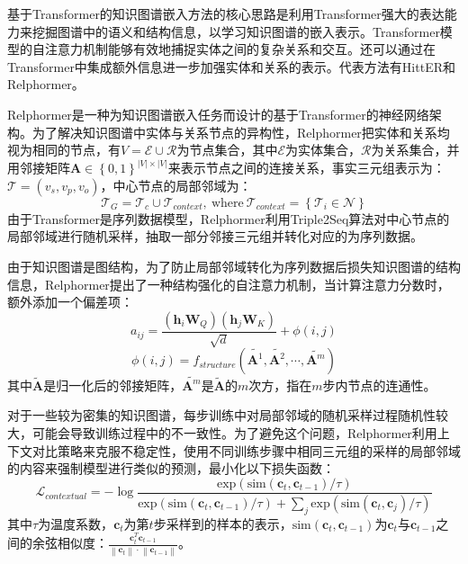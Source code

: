 基于Transformer的知识图谱嵌入方法的核心思路是利用Transformer强大的表达能力来挖掘图谱中的语义和结构信息，以学习知识图谱的嵌入表示。Transformer模型的自注意力机制能够有效地捕捉实体之间的复杂关系和交互。还可以通过在Transformer中集成额外信息进一步加强实体和关系的表示。代表方法有HittER和Relphormer。

Relphormer是一种为知识图谱嵌入任务而设计的基于Transformer的神经网络架构。为了解决知识图谱中实体与关系节点的异构性，Relphormer把实体和关系均视为相同的节点，有$ V=\mathcal{E} \cup \mathcal{R}$为节点集合，其中$\mathcal{E}$为实体集合，$\mathcal{R}$为关系集合，并用邻接矩阵$\mathbf{A} \in\left\{0,1\right\}^{\left\lvert V\right\rvert\times \left\lvert V\right\rvert} $来表示节点之间的连接关系，事实三元组表示为：$\mathcal{T} =(v_s,v_p,v_o)$，中心节点的局部邻域为：
\begin{equation}
  \mathcal{T}_G = \mathcal{T}_c \cup \mathcal{T}_{context}, \ \mbox{where} \ \mathcal{T}_{context} =\left\{\mathcal{T}_i\in\mathcal{N} \right\} 
\end{equation}
由于Transformer是序列数据模型，Relphormer利用Triple2Seq算法对中心节点的局部邻域进行随机采样，抽取一部分邻接三元组并转化对应的为序列数据。

由于知识图谱是图结构，为了防止局部邻域转化为序列数据后损失知识图谱的结构信息，Relphormer提出了一种结构强化的自注意力机制，当计算注意力分数时，额外添加一个偏差项：
\begin{equation}
  a_{ij}=\frac{(\mathbf{h}_i\mathbf{W}_Q)(\mathbf{h}_j\mathbf{W}_K)}{\sqrt{d}}+\phi (i,j)
\end{equation}
\begin{equation}
  \phi (i,j)=f_{structure}(\tilde{\mathbf{A}^1},\tilde{\mathbf{A}^2},\cdots,\tilde{\mathbf{A}^m} )
\end{equation}
其中$\tilde{\mathbf{A}}$是归一化后的邻接矩阵，$\tilde{\mathbf{A}^m}$是$\tilde{\mathbf{A}}$的$m$次方，指在$m$步内节点的连通性。

对于一些较为密集的知识图谱，每步训练中对局部邻域的随机采样过程随机性较大，可能会导致训练过程中的不一致性。为了避免这个问题，Relphormer利用上下文对比策略来克服不稳定性，使用不同训练步骤中相同三元组的采样的局部邻域的内容来强制模型进行类似的预测，最小化以下损失函数：
\begin{equation}
  \mathcal{L}_{contextual} = -\log\frac{\mbox{exp}(\mbox{sim}(\boldsymbol{c}_t,\boldsymbol{c}_{t-1})/\tau )}{\mbox{exp}(\mbox{sim}(\boldsymbol{c}_t,\boldsymbol{c}_{t-1})/\tau )+\sum_j\mbox{exp}(\mbox{sim}(\boldsymbol{c}_t,\boldsymbol{c}_{j})/\tau )}
\end{equation}
其中$\tau$为温度系数，$\boldsymbol{c}_t$为第$t$步采样到的样本的表示，$\mbox{sim}(\boldsymbol{c}_t,\boldsymbol{c}_{t-1})$为$\boldsymbol{c}_t$与$\boldsymbol{c}_{t-1}$之间的余弦相似度：$\frac{\boldsymbol{c}_t^T\boldsymbol{c}_{t-1}}{\left\lVert \boldsymbol{c}_{t}\right\rVert \cdot \left\lVert \boldsymbol{c}_{t-1}\right\rVert }$。


